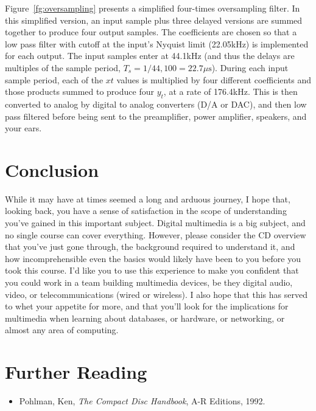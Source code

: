 Figure~\ref{fg:oversampling} presents a simplified four-times
oversampling filter. In this simplified version, an input sample plus
three delayed versions are summed together to produce four output
samples. The coefficients are chosen so that a low pass filter with
cutoff at the input's Nyquist limit (22.05kHz) is implemented for each
output. The input samples enter at 44.1kHz (and thus the delays are
multiples of the sample period,
$T_s=1/44,100=22.7\mu\mathrm{s}$). During each input sample period,
each of the $xt$ values is multiplied by four different coefficients
and those products summed to produce four $y_t$, at a rate of
176.4kHz. This is then converted to analog by digital to analog
converters (D/A or DAC), and then low pass filtered before being sent
to the preamplifier, power amplifier, speakers, and your ears.

\section{Conclusion}

While it may have at times seemed a long and arduous journey, I hope
that, looking back, you have a sense of satisfaction in the scope of
understanding you've gained in this important subject.  Digital
multimedia is a big subject, and no single course can cover
everything. However, please consider the CD overview that you've just
gone through, the background required to understand it, and how
incomprehensible even the basics would likely have been to you before
you took this course.  I'd like you to use this experience to make you
confident that you could work in a team building multimedia devices,
be they digital audio, video, or telecommunications (wired or
wireless).  I also hope that this has served to whet your appetite for
more, and that you'll look for the implications for multimedia when
learning about databases, or hardware, or networking, or almost any
area of computing.

\section{Further Reading}

\begin{itemize}
\item Pohlman, Ken, \textit{The Compact Disc Handbook}, A-R Editions,
  1992.
\end{itemize}
